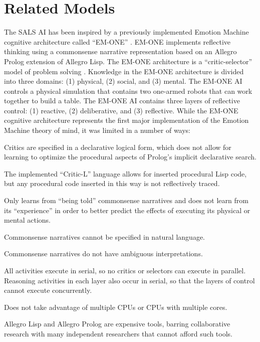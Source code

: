 \chapter{Related Models}
\label{chapter:related_models}

The SALS AI has been inspired by a previously implemented Emotion
Machine cognitive architecture called ``EM-ONE'' \cite[]{singh:2005b}.
EM-ONE implements reflective thinking using a commonsense narrative
representation based on an Allegro Prolog extension of Allegro Lisp.
The EM-ONE architecture is a ``critic-selector'' model of problem
solving
\cite[]{singh:2002a,singh:2004,singh:2005a,singh:2005b,minsky:2006,morgan:2009}.
Knowledge in the EM-ONE architecture is divided into three domains:
(1) physical, (2) social, and (3) mental.  The EM-ONE AI controls a
physical simulation that contains two one-armed robots that can work
together to build a table.  The EM-ONE AI contains three layers of
reflective control: (1) reactive, (2) deliberative, and (3)
reflective.  While the EM-ONE cognitive architecture represents the
first major implementation of the Emotion Machine theory of mind, it
was limited in a number of ways:
\begin{packed_enumerate}
\item{Critics are specified in a declarative logical form, which does
  not allow for learning to optimize the procedural aspects of
  Prolog's implicit declarative search.}
\item{The implemented ``Critic-L'' language allows for inserted
  procedural Lisp code, but any procedural code inserted in this way
  is not reflectively traced.}
\item{Only learns from ``being told'' commonsense narratives and does
  not learn from its ``experience'' in order to better predict the
  effects of executing its physical or mental actions.}
\item{Commonsense narratives cannot be specified in natural language.}
\item{Commonsense narratives do not have ambiguous interpretations.}
\item{All activities execute in serial, so no critics or selectors can
  execute in parallel.  Reasoning activities in each layer also occur
  in serial, so that the layers of control cannot execute
  concurrently.}
\item{Does not take advantage of multiple CPUs or CPUs with multiple
  cores.}
\item{Allegro Lisp and Allegro Prolog are expensive tools, barring
  collaborative research with many independent researchers that cannot
  afford such tools.}
\end{packed_enumerate}

